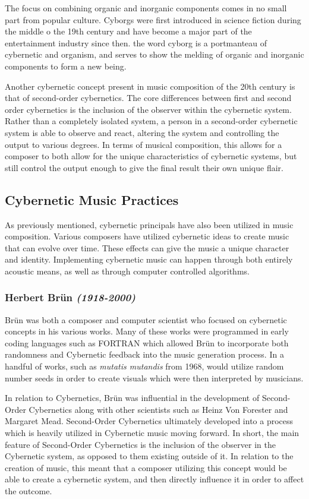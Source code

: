 The focus on combining organic and inorganic components comes in no small part from popular culture. Cyborgs were first introduced in science fiction during the middle o the 19th century and have become a major part of the entertainment industry since then. the word cyborg is a portmanteau of cybernetic and organism, and serves to show the melding of organic and inorganic components to form a new being.

Another cybernetic concept present in music composition of the 20th century is that of second-order cybernetics. The core differences between first and second order cybernetics is the inclusion of the observer within the cybernetic system. Rather than a completely isolated system, a person in a second-order cybernetic system is able to observe and react, altering the system and controlling the output to various degrees. In terms of musical composition, this allows for a composer to both allow for the unique characteristics of cybernetic systems, but still control the output enough to give the final result their own unique flair.



\subsection{Cybernetic Music Practices}
As previously mentioned, cybernetic principals have also been utilized in music composition. Various composers have utilized cybernetic ideas to create music that can evolve over time. These effects can give the music a unique character and identity. Implementing cybernetic music can happen through both entirely acoustic means, as well as through computer controlled algorithms.



\subsubsection{Herbert Brün \textit{(1918-2000)}}
Brün was both a composer and computer scientist who focused on cybernetic concepts in his various works. Many of these works were programmed in early coding languages such as FORTRAN which allowed Brün to incorporate both randomness and Cybernetic feedback into the music generation process. In a handful of works, such as \textit{mutatis mutandis} from 1968, would utilize random number seeds in order to create visuals which were then interpreted by musicians.

In relation to Cybernetics, Brün was influential in the development of Second-Order Cybernetics along with other scientists such as Heinz Von Forester and Margaret Mead. Second-Order Cybernetics ultimately developed into a process which is heavily utilized in Cybernetic music moving forward. In short, the main feature of Second-Order Cybernetics is the inclusion of the observer in the Cybernetic system, as opposed to them existing outside of it\cite{Scott_2nd_order_Cyber}. In relation to the creation of music, this meant that a composer utilizing this concept would be able to create a cybernetic system, and then directly influence it in order to affect the outcome.


